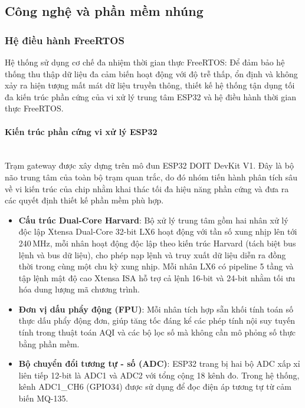 \documentclass[12pt,a4paper]{article}
\begin{document}
\subsection{Công nghệ và phần mềm nhúng}

\subsubsection{Hệ điều hành FreeRTOS}
Hệ thống sử dụng cơ chế đa nhiệm thời gian thực FreeRTOS:
Để đảm bảo hệ thống thu thập dữ liệu đa cảm biến hoạt động với độ trễ thấp, ổn định và không xảy ra hiện tượng mất mát dữ liệu truyền thông, thiết kế hệ thống tận dụng tối đa kiến trúc phần cứng của vi xử lý trung tâm ESP32 và hệ điều hành thời gian thực FreeRTOS.

\paragraph{Kiến trúc phần cứng vi xử lý ESP32}\mbox{}\\

Trạm gateway được xây dựng trên mô đun ESP32 DOIT DevKit V1. Đây là bộ não trung tâm của toàn bộ trạm quan trắc, do đó nhóm tiến hành phân tích sâu về vi kiến trúc của chip nhằm khai thác tối đa hiệu năng phần cứng và đưa ra các quyết định thiết kế phần mềm phù hợp.

\begin{itemize}
    \item \textbf{Cấu trúc Dual-Core Harvard}: Bộ xử lý trung tâm gồm hai nhân xử lý độc lập Xtensa Dual-Core 32-bit LX6 hoạt động với tần số xung nhịp lên tới 240\,MHz, mỗi nhân hoạt động độc lập theo kiến trúc Harvard (tách biệt bus lệnh và bus dữ liệu), cho phép nạp lệnh và truy xuất dữ liệu diễn ra đồng thời trong cùng một chu kỳ xung nhịp. Mỗi nhân LX6 có pipeline 5 tầng và tập lệnh mật độ cao Xtensa ISA hỗ trợ cả lệnh 16-bit và 24-bit nhằm tối ưu hóa dung lượng mã chương trình.
    \item \textbf{Đơn vị dấu phẩy động (FPU)}: Mỗi nhân tích hợp sẵn khối tính toán số thực dấu phẩy động đơn, giúp tăng tốc đáng kể các phép tính nội suy tuyến tính trong thuật toán AQI và các bộ lọc số mà không cần mô phỏng số thực bằng phần mềm.
    \item \textbf{Bộ chuyển đổi tương tự - số (ADC)}: ESP32 trang bị hai bộ ADC xấp xỉ liên tiếp 12-bit là ADC1 và ADC2 với tổng cộng 18 kênh đo. Trong hệ thống, kênh ADC1\_CH6 (GPIO34) được sử dụng để đọc điện áp tương tự từ cảm biến MQ-135.
\end{itemize}
\end{document}
